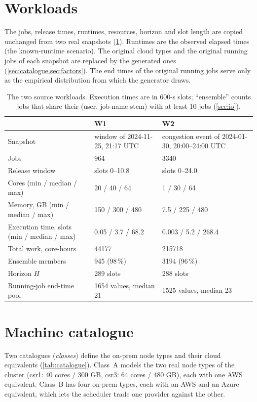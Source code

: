 \documentclass[11pt,a4paper]{article}
\begin{document}
\section{Workloads}\label{sec:workloads}
The jobs, release times, runtimes, resources, horizon and slot length are copied
unchanged from two real snapshots (\cref{tab:workloads}). Runtimes are the
observed elapsed times (the known-runtime scenario). The original cloud types
and the original running jobs of each snapshot are replaced by the generated ones
(\cref{sec:catalogue,sec:factors}). The end times of the original running jobs
serve only as the empirical distribution from which the generator draws.

\begin{table}[ht]
\centering\small
\caption{The two source workloads. Execution times are in 600-s slots;
``ensemble'' counts jobs that share their (user, job-name stem) with at least
10 jobs (\cref{sec:io}).}
\label{tab:workloads}
\begin{tabularx}{\linewidth}{lXX}
\toprule
 & W1 & W2 \\
\midrule
Snapshot & window of 2024-11-25, 21:17 UTC & congestion event of 2024-01-30, 20:00--24:00 UTC \\
Jobs & 964 & \num{3340} \\
Release window & slots 0--10.8 & slots 0--24.0 \\
Cores (min / median / max) & 20 / 40 / 64 & 1 / 30 / 64 \\
Memory, GB (min / median / max) & 150 / 300 / 480 & 7.5 / 225 / 480 \\
Execution time, slots (min / median / max) & 0.05 / 3.7 / 68.2 & 0.003 / 5.2 / 268.4 \\
Total work, core-hours & \num{44177} & \num{215718} \\
Ensemble members & 945 (98\,\%) & \num{3194} (96\,\%) \\
Horizon $H$ & 289 slots & 288 slots \\
Running-job end-time pool & \num{1654} values, median 21 & \num{1525} values, median 23 \\
\bottomrule
\end{tabularx}
\end{table}

\section{Machine catalogue}\label{sec:catalogue}
Two catalogues (\emph{classes}) define the on-prem node types and their cloud
equivalents (\cref{tab:catalogue}). Class~A models the two real node types of the
cluster (csr1: 40 cores / 300 GB, csr3: 64 cores / 480 GB), each with one AWS
equivalent. Class~B has four on-prem types, each with an AWS and an Azure
equivalent, which lets the scheduler trade one provider against the other.
\end{document}
